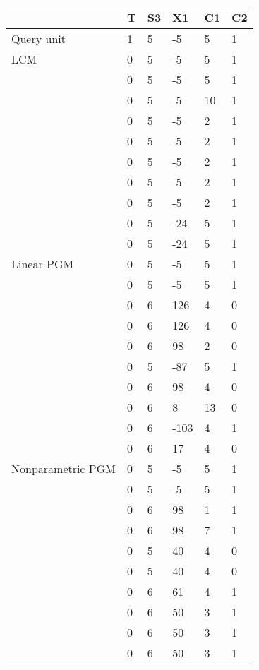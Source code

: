 \begin{tabular}{llllll}
\toprule
{} &  T & S3 &    X1 &  C1 & C2 \\
\midrule
Query unit        &  1 &  5 &    -5 &   5 &  1 \\
LCM               &  0 &  5 &    -5 &   5 &  1 \\
                  &  0 &  5 &    -5 &   5 &  1 \\
                  &  0 &  5 &    -5 &  10 &  1 \\
                  &  0 &  5 &    -5 &   2 &  1 \\
                  &  0 &  5 &    -5 &   2 &  1 \\
                  &  0 &  5 &    -5 &   2 &  1 \\
                  &  0 &  5 &    -5 &   2 &  1 \\
                  &  0 &  5 &    -5 &   2 &  1 \\
                  &  0 &  5 &   -24 &   5 &  1 \\
                  &  0 &  5 &   -24 &   5 &  1 \\
Linear PGM        &  0 &  5 &    -5 &   5 &  1 \\
                  &  0 &  5 &    -5 &   5 &  1 \\
                  &  0 &  6 &   126 &   4 &  0 \\
                  &  0 &  6 &   126 &   4 &  0 \\
                  &  0 &  6 &    98 &   2 &  0 \\
                  &  0 &  5 &   -87 &   5 &  1 \\
                  &  0 &  6 &    98 &   4 &  0 \\
                  &  0 &  6 &     8 &  13 &  0 \\
                  &  0 &  6 &  -103 &   4 &  1 \\
                  &  0 &  6 &    17 &   4 &  0 \\
Nonparametric PGM &  0 &  5 &    -5 &   5 &  1 \\
                  &  0 &  5 &    -5 &   5 &  1 \\
                  &  0 &  6 &    98 &   1 &  1 \\
                  &  0 &  6 &    98 &   7 &  1 \\
                  &  0 &  5 &    40 &   4 &  0 \\
                  &  0 &  5 &    40 &   4 &  0 \\
                  &  0 &  6 &    61 &   4 &  1 \\
                  &  0 &  6 &    50 &   3 &  1 \\
                  &  0 &  6 &    50 &   3 &  1 \\
                  &  0 &  6 &    50 &   3 &  1 \\
\bottomrule
\end{tabular}
